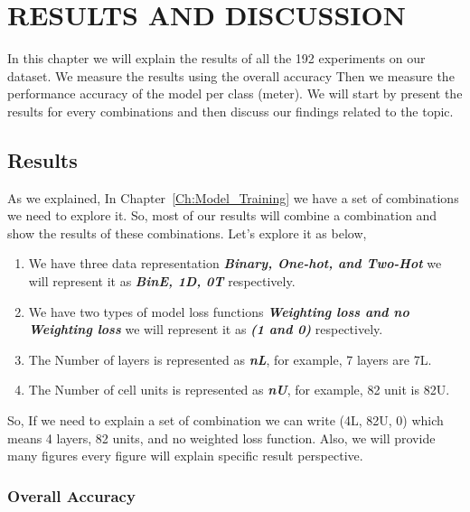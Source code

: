 \chapter{\uppercase{Results And Discussion}}\label{Ch:Results}

In this chapter we will explain the results of all the 192 experiments on our dataset. We measure the results using the overall accuracy Then we measure the performance accuracy of the model per class (meter). We will start by present the results for every combinations and then discuss our findings related to the topic.

\section{Results}

As we explained, In Chapter~\ref{Ch:Model_Training} we have a set of combinations we need to explore it. So, most of our results will combine a combination and show the results of these combinations. Let's explore it as below,
\begin{enumerate}
\item  We have three data representation \textbf{\textit{Binary, One-hot, and Two-Hot}} we will represent it as \textbf{\textit{BinE, 1D, 0T}} respectively.
\item We have two types of model loss functions \textbf{\textit{Weighting loss and no Weighting loss}} we will represent it as \textbf{\textit{(1 and 0)}} respectively.
\item The Number of layers is represented as \textbf{\textit{nL}}, for example, 7 layers are 7L.
  \item The Number of cell units is represented as \textbf{\textit{nU}}, for example, 82 unit is 82U.
  \end{enumerate}

  So, If we need to explain a set of combination we can write (4L, 82U, 0) which means 4 layers, 82 units, and no weighted loss function. Also, we will provide many figures every figure will explain specific result perspective.
  
\subsection{Overall Accuracy}


